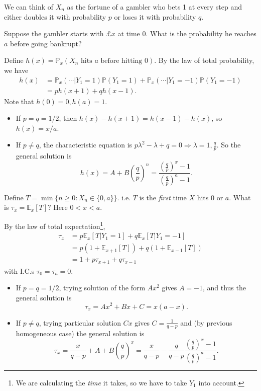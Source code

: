 We can think of $X_n$ as the fortune of a gambler who bets 1 at every step and either doubles it with probability $p$ or loses it with probability $q$.
\begin{example}
    Suppose the gambler starts with \pounds$ x $ at time 0. What is the probability he reaches $a$ before going bankrupt?

    Define $ h(x) = \mathbb{P}_x(X_n \text{ hits }a \text{ before hitting }0) $. By the law of total probability, we have
    \begin{align*}
        h(x)&=\mathbb{P}_x(\cdots|Y_1=1)\mathbb{P}(Y_1=1)+\mathbb{P}_x(\cdots|Y_1=-1)\mathbb{P}(Y_1=-1)\\ 
       &= p h(x+1)+q h(x-1).
    \end{align*}
    Note that $ h(0)=0,h(a)=1$.
    \begin{itemize}
        \item If $ p=q=1/2 $, then $ h(x)-h(x+1)=h(x-1)-h(x) $, so $ h(x) = x/a $.
        \item If $ p\neq q $, the characteristic equation is $ p\lambda^2-\lambda+q=0 \Rightarrow \lambda=1,\frac{q}{p} $. So the general solution is 
        \[
            h(x) = A+B\left( \frac{q}{p} \right)^n = \frac{\left( \frac{q}{p} \right)^x-1}{\left( \frac{q}{p} \right)^a-1}.
        \]
    \end{itemize}
\end{example}
\begin{example}
    Define $ T =\min \{n\ge 0: X_n\in \{0,a\}\} $. i.e. $T$ is the \textit{first} time $X$ hits $0$ or $a$. What is $ \tau_x = \mathbb{E}_x[T] $? Here $ 0<x<a $.

    By the law of total expectation\footnote{We are calculating the \textit{time} it takes, so we have to take $Y_1$ into account.},
    \begin{align*}
        \tau_x &= p\mathbb{E}_x[T|Y_1=1]+q\mathbb{E}_x[T|Y_1=-1]\\ 
        &= p(1+\mathbb{E}_{x+1}[T])+q(1+\mathbb{E}_{x-1}[T])\\ 
        &= 1+ p \tau_{x+1}+q \tau_{x-1}
    \end{align*}
    with I.C.s $ \tau_0=\tau_a=0 $.
    \begin{itemize}
        \item If $ p=q=1/2 $, trying solution of the form $ Ax^2 $ gives $A=-1$, and thus the general solution is 
        \[
            \tau_x = Ax^2+Bx+C = x(a-x).
        \]
        \item If $ p\neq q $, trying particular solution $ Cx $ gives $ C=\frac{1}{q-p} $ and (by previous homogeneous case) the general solution is 
        \[
            \tau_x = \frac{x}{q-p}+A+B\left( \frac{q}{p} \right)^x = \frac{x}{q-p}-\frac{q}{q-p}\frac{\left( \frac{q}{p} \right)^x-1}{\left( \frac{q}{p} \right)^a-1}.
        \]
    \end{itemize}
\end{example}

